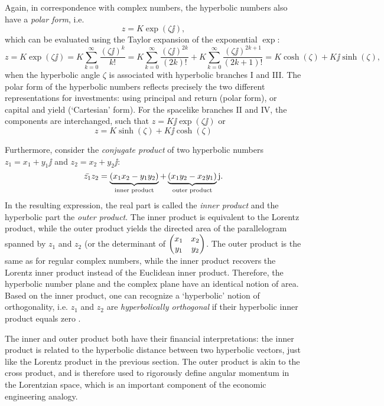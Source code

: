 Again, in correspondence with complex numbers, the hyperbolic numbers also have a \emph{polar form}, i.e.
\[
     z = K \exp(\zeta \jj),
\]
which can be evaluated using the Taylor expansion of the exponential \(\exp\):
\[
     z = K\exp(\zeta \jj) = K \sum^\infty_{k = 0} \frac{(\zeta \jj)^k}{k!} =  K \sum^\infty_{k = 0} \frac{(\zeta \jj)^{2k}}{(2k)!} + K \sum^\infty_{k = 0} \frac{(\zeta \jj)^{2k+1}}{(2k + 1)!} = K\cosh(\zeta) + K\jj\sinh(\zeta),
\]
when the hyperbolic angle \(\zeta\) is associated with hyperbolic branches I and III. The polar form of the hyperbolic numbers reflects precisely the two different representations for investments: using principal and return (polar form), or capital and yield (`Cartesian' form). For the spacelike branches II and IV, the components are interchanged, such that \(z = K\jj\exp(\zeta\jj)\) or
\[
     z = K\sinh(\zeta) + K\jj\cosh(\zeta)
\]

Furthermore, consider the \emph{conjugate product} of two hyperbolic numbers \(z_1 = x_1 + y_1\jj\) and \(z_2 = x_2 + y_2\jj\):
\[
    \bar{z_1}z_2 = \underbrace{(x_1x_2 - y_1y_2)}_\text{inner product} 
            + \underbrace{(x_1y_2 - x_2y_1)}_\text{outer product}\mathrm{j}.
\]
In the resulting expression, the real part is called the \emph{inner product} and the hyperbolic part the \emph{outer product}. The inner product is equivalent to the Lorentz product, while the outer product yields the directed area of the parallelogram spanned by \(z_1\) and \(z_2\) (or the determinant of \(\mqty(x_1 & x_2\\y_1&y_2)\). The outer product is the same as for regular complex numbers, while the inner product recovers the Lorentz inner product instead of the Euclidean inner product. Therefore, the hyperbolic number plane and the complex plane have an identical notion of area. Based on the inner product, one can recognize a `hyperbolic' notion of orthogonality, i.e. \(z_1\) and \(z_2\) are \emph{hyperbolically orthogonal} if their hyperbolic inner product equals zero \cite{Needham1997, Sobczyk1995}.

The inner and outer product both have their financial interpretations: the inner product is related to the hyperbolic distance between two hyperbolic vectors, just like the Lorentz product in the previous section. The outer product is akin to the cross product, and is therefore used to rigorously define angular momentum in the Lorentzian space, which is an important component of the economic engineering analogy.


